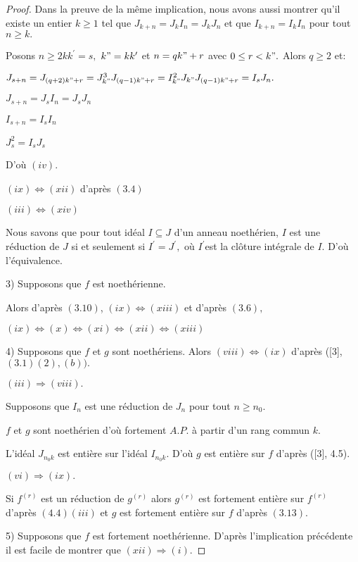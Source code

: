 \begin{proof}
	Dans la preuve de la même implication, nous avons aussi montrer qu'il existe un entier $k\geq 1$ tel que $J_{k+n}=J_{k}I_{n}=J_{k}J_{n}$ et que $I_{k+n}=I_{k}I_{n}$ pour tout $n\geq k.$
	
	Posons $n\geq 2kk^{\prime }=s,$ $k"=kk^{\prime }$ et $n=qk"+r$ avec $0\leq r<k".$ Alors $q\geq 2$ et:
	
	$J_{s+n}=J_{(q+2)k"+r}=J_{k"}^{3}J_{(q-1)k"+r}=I_{k"}^{2}J_{k"}J_{(q-1)k"+r}=I_{s}J_{n}.$
	
	$J_{s+n}=J_{s}I_{n}=J_{s}J_{n}$
	
	$I_{s+n}=I_{s}I_{n}$
	
	$J_{s}^{2}=I_{s}J_{s}$
	
	D'où $(iv).$
	
	$(ix)\Longleftrightarrow (xii)$ d'après $(3.4)$
	
	$(iii)\Longleftrightarrow (xiv)$
	
	Nous savons que pour tout idéal $I\subseteq J$ d'un anneau noethérien, $I$ est une réduction de $J$ si et seulement si $I^{\prime }=J^{\prime },$ où $I^{\prime }$est la clôture intégrale de $I.$ D'où l'équivalence. 
	
	3) Supposons que $f$ est noethérienne.
	
	Alors d'après $(3.10)$, $(ix)\Longleftrightarrow (xiii)$ et d'après $(3.6),$ 
	
	$(ix)\Longleftrightarrow (x)\Longleftrightarrow (xi)\Longleftrightarrow (xii)\Longleftrightarrow (xiii)$
	
	4) Supposons que $f$ et $g$ sont noethériens. Alors $(viii)\Longleftrightarrow (ix)$ d'après ([3], $(3.1)(2),(b)).$
	
	$(iii)\Longrightarrow (viii).$
	
	Supposons que $I_{n}$ est une réduction de $J_{n}$ pour tout $n\geq n_{0}.$
	
	$f$ et $g$ sont noethérien d'où fortement $A.P.$ \`{a} partir d'un rang
	commun $k.$
	
	L'idéal $J_{n_{0}k}$ est entière sur l'idéal $I_{n_{0}k}.$ D'où $g$ est entière sur $f$ d'après ([3], 4.5).
	
	$(vi)\Longrightarrow (ix).$
	
	Si $f^{(r)}$ est un réduction de $g^{(r)}$ alors $g^{(r)}$ est fortement entière sur $f^{(r)}$ d'après $(4.4)(iii)$ et $g$ est fortement entière sur $f$ d'après $(3.13).$
	
	5) Supposons que $f$ est fortement noethérienne. D'après
	l'implication précédente il est facile de montrer que $(xii)\Longrightarrow (i).$
	

\end{proof}
